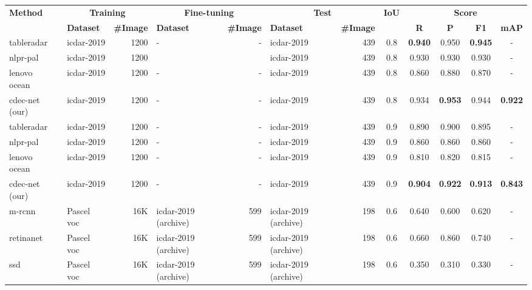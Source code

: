 \documentclass[a4paper,conference]{IEEEtran}
\begin{document}
\begin{table*}
\addtolength{\tabcolsep}{-3.1pt}
\begin{center}
\begin{tabular}{|l| l | r|l |r|l|r| c| c c c c|} \hline
\textbf{Method} &\multicolumn{2}{|c|}{\textbf{Training}} &\multicolumn{2}{|c|}{\textbf{Fine-tuning}} &\multicolumn{2}{|c|}{\textbf{Test}} &\textbf{IoU} & \multicolumn{4}{|c|}{\textbf{Score}} \\ \cline{2-7} \cline{9-12}
  &\textbf{Dataset} &\textbf{\#Image} &\textbf{Dataset} &\textbf{\#Image} &\textbf{Dataset} &\textbf{\#Image} &  &\textbf{R} &\textbf{P} &\textbf{F1} &\textbf{mAP} \\ \hline  
{\sc t}able{\sc r}adar~\cite{gao2019icdar} &{\sc icdar}-2019 &1200 &- &- &{\sc icdar}-2019 &439 &0.8 &\textbf{0.940} &0.950 &\textbf{0.945} &- \\
{\sc nlpr-pal}~\cite{gao2019icdar} &{\sc icdar}-2019 &1200 & & &{\sc icdar}-2019 &439 &0.8 &0.930 &0.930 &0.930 &- \\
{\sc l}enovo {\sc o}cean~\cite{gao2019icdar} &{\sc icdar}-2019 &1200 &- &- &{\sc icdar}-2019 &439 &0.8 &0.860 &0.880 &0.870 &- \\ 
{\sc cd}e{\sc c-n}et (our) &{\sc icdar}-2019 &1200 &- &- &{\sc icdar}-2019 &439 &0.8 &0.934 &\textbf{0.953} &0.944 &\textbf{0.922} \\ 
\hhline{|=|=|=|=|=|=|=|=|====|}
{\sc t}able{\sc r}adar~\cite{gao2019icdar} &{\sc icdar}-2019 &1200 &- &- &{\sc icdar}-2019 &439 &0.9 &0.890 &0.900 &0.895 &- \\
{\sc nlpr-pal}~\cite{gao2019icdar} &{\sc icdar}-2019 &1200 &- &- &{\sc icdar}-2019 &439 &0.9 &0.860 &0.860 &0.860 &- \\
{\sc l}enovo {\sc o}cean~\cite{gao2019icdar} &{\sc icdar}-2019 &1200 &- &- &{\sc icdar}-2019 &439 &0.9 &0.810 &0.820 &0.815 &- \\ 
{\sc cd}e{\sc c-n}et (our) &{\sc icdar}-2019 &1200 &- &- &{\sc icdar}-2019 &439 &0.9 &\textbf{0.904} &\textbf{0.922} &\textbf{0.913} &\textbf{0.843} \\ 
\hhline{|=|=|=|=|=|=|=|=|====|}
{\sc m-rcnn}~\cite{casado2019benefits} &Pascel {\sc voc} &16K &{\sc icdar}-2019 (archive) &599 &{\sc icdar}-2019 (archive) &198 &0.6 &0.640 &0.600 &0.620 &- \\
{\sc r}etina{\sc n}et~\cite{casado2019benefits} &Pascel {\sc voc} &16K &{\sc icdar}-2019 (archive) &599 &{\sc icdar}-2019 (archive) &198 &0.6 &0.660 &0.860 &0.740 &- \\
{\sc ssd}~\cite{casado2019benefits} &Pascel {\sc voc} &16K &{\sc icdar}-2019 (archive) &599 &{\sc icdar}-2019 (archive) &198 &0.6 &0.350 &0.310 &0.330 &- \\

\end{tabular}
\end{center}
\end{table*}
\end{document}

